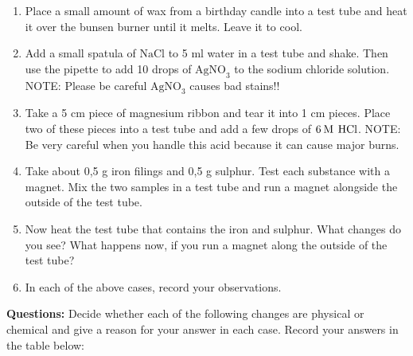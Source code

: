         \label{m38709*id62119}\begin{enumerate}[noitemsep, label=\textbf{\arabic*}. ] 
            \label{m38709*uid27}\item Place a small amount of wax from a birthday candle into a test tube and heat it over the bunsen burner until it melts. Leave it to cool.
\label{m38709*uid28}\item Add a small spatula of $\mathrm{NaCl}$ to 5 ml water in a test tube and shake. Then use the pipette to add 10 drops of ${\mathrm{AgNO}}_{3}$ to the sodium chloride solution. NOTE: Please be careful ${\mathrm{AgNO}}_{3}$ causes bad stains!!
\label{m38709*uid29}\item Take a 5 cm piece of magnesium ribbon and tear it into 1 cm pieces. Place two of these pieces into a test tube and add a few drops of $6\phantom{\rule{2pt}{0ex}}\mathrm{M}\phantom{\rule{4pt}{0ex}}\mathrm{HCl}$. NOTE: Be very careful when you handle this acid because it can cause major burns.
\label{m38709*uid30}\item Take about 0,5 g iron filings and 0,5 g sulphur. Test each substance with a magnet. Mix the two samples in a test tube and run a magnet alongside the outside of the test tube.
\label{m38709*uid31}\item Now heat the test tube that contains the iron and sulphur. What changes do you see? What happens now, if you run a magnet along the outside of the test tube?
\label{m38709*uid32}\item In each of the above cases, record your observations.
\end{enumerate}
        \par 
        \label{m38709*id63979}\noindent{}\textbf{Questions:}
Decide whether each of the following changes are physical or chemical and give a reason for your answer in each case. Record your answers in the table below:
